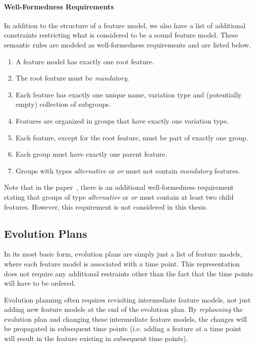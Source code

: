 \documentclass[a4paper,english]{ifimaster}
\begin{document}
\paragraph{Well-Formedness Requirements}%
\label{par:well_formedness_requirements}

In addition to the structure of a feature model, we also have a list of additional constraints restricting what is considered to be a sound feature model. These semantic rules are modeled as well-formedness requirements and are listed below.

\begin{enumerate}[\textit{\textbf{WF\arabic*}}, itemsep=0mm]
  \item A feature model has exactly one root feature.
  \item The root feature must be \textit{mandatory}.
  \item Each feature has exactly one unique name, variation type and (potentially empty) collection of subgroups.
  \item Features are organized in groups that have exactly one variation type.
  \item Each feature, except for the root feature, must be part of exactly one group.
  \item Each group must have exactly one parent feature.
  \item Groups with types \textit{alternative} or \textit{or} must not contain \textit{mandatory} features.
\end{enumerate}

Note that in the paper~\cite{cite:consistency_preserving_evolution_planning}, there is an additional well-formedness requirement stating that groups of type \textit{alternative} or \textit{or} must contain at least two child features. However, this requirement is not considered in this thesis.

\subsection{Evolution Plans}%
\label{sub:evolution_plans}

In its most basic form, evolution plans are simply just a list of feature models, where each feature model is associated with a time point. This representation does not require any additional restraints other than the fact that the time points will have to be ordered.

Evolution planning often requires revisiting intermediate feature models, not just adding new feature models at the end of the evolution plan. By \textit{replanning} the evolution plan and changing these intermediate feature models, the changes will be propagated in subsequent time points (i.e. adding a feature at a time point will result in the feature existing in subsequent time points).
\end{document}
